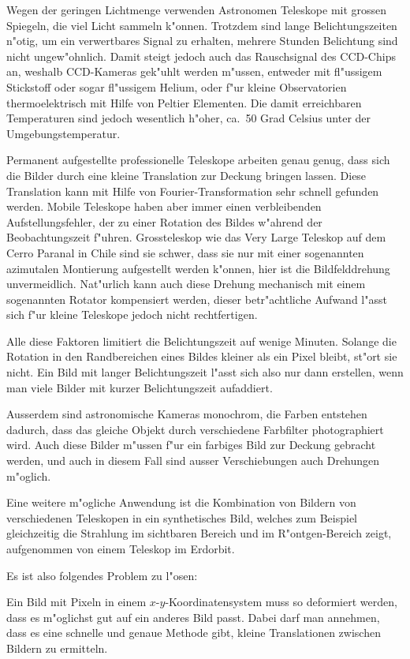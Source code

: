 Wegen der geringen Lichtmenge verwenden Astronomen Teleskope mit
grossen Spiegeln, die viel Licht sammeln k"onnen. Trotzdem sind lange
Belichtungszeiten n"otig, um ein verwertbares Signal zu erhalten,
mehrere Stunden Belichtung sind nicht ungew"ohnlich.
Damit steigt jedoch auch das Rauschsignal des CCD-Chips an, weshalb
CCD-Kameras gek"uhlt werden m"ussen, entweder mit fl"ussigem Stickstoff
oder sogar fl"ussigem Helium, oder f"ur kleine Observatorien thermoelektrisch
mit Hilfe von Peltier Elementen.
Die damit erreichbaren Temperaturen sind jedoch wesentlich h"oher,
ca.~50 Grad Celsius unter der Umgebungstemperatur.

Permanent aufgestellte professionelle Teleskope arbeiten genau
genug, dass sich die Bilder durch eine kleine Translation zur
Deckung bringen lassen.
Diese Translation kann mit Hilfe von Fourier-Transformation sehr
schnell gefunden werden.
Mobile Teleskope haben aber immer einen verbleibenden Aufstellungsfehler,
der zu einer Rotation des Bildes w"ahrend der Beobachtungszeit f"uhren.
Grossteleskop wie das Very Large Teleskop auf dem Cerro Paranal in
Chile sind sie schwer, dass sie nur mit einer sogenannten azimutalen
Montierung aufgestellt werden k"onnen, hier ist die Bildfelddrehung
unvermeidlich.
Nat"urlich kann auch diese Drehung mechanisch mit einem sogenannten
Rotator kompensiert werden, dieser betr"achtliche Aufwand l"asst sich
f"ur kleine Teleskope jedoch nicht rechtfertigen.

Alle diese Faktoren limitiert die Belichtungszeit auf wenige Minuten.
Solange die Rotation in den
Randbereichen eines Bildes kleiner als ein Pixel bleibt, st"ort
sie nicht.
Ein Bild mit langer Belichtungszeit l"asst sich also nur dann erstellen,
wenn man viele Bilder mit kurzer Belichtungszeit aufaddiert.

Ausserdem sind astronomische Kameras monochrom, die Farben entstehen
dadurch, dass das gleiche Objekt durch verschiedene Farbfilter photographiert
wird. Auch diese Bilder m"ussen f"ur ein farbiges Bild zur Deckung
gebracht werden, und auch in diesem Fall sind ausser Verschiebungen
auch Drehungen m"oglich. 

Eine weitere m"ogliche Anwendung ist die Kombination von Bildern von
verschiedenen Teleskopen in ein synthetisches Bild, welches zum Beispiel
gleichzeitig die Strahlung im sichtbaren Bereich und im R"ontgen-Bereich
zeigt, aufgenommen von einem Teleskop im Erdorbit.

Es ist also folgendes Problem zu l"osen:

\begin{aufgabe}
Ein Bild mit Pixeln in einem
$x$-$y$-Koordinatensystem muss so deformiert werden, dass es m"oglichst
gut auf ein anderes Bild passt. Dabei darf man annehmen, dass es eine
schnelle und genaue Methode gibt, kleine Translationen zwischen Bildern 
zu ermitteln.
\end{aufgabe}

